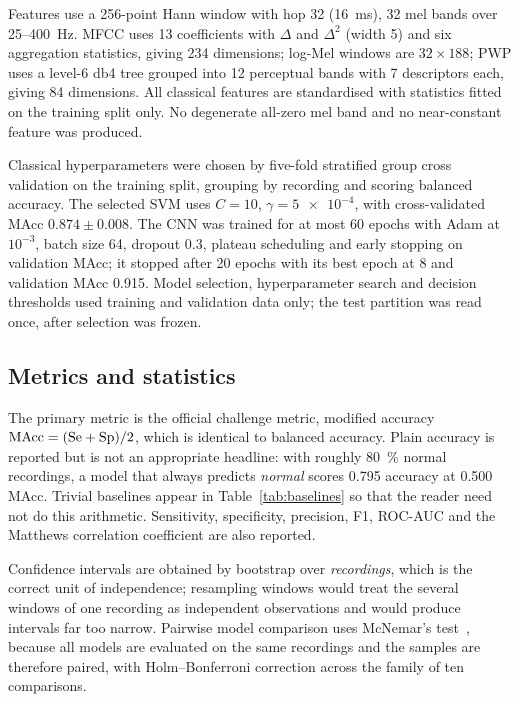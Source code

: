 Features use a 256-point Hann window with hop 32 (\SI{16}{\milli\second}), 32
mel bands over 25--\SI{400}{\hertz}. MFCC uses 13 coefficients with $\Delta$ and
$\Delta^2$ (width 5) and six aggregation statistics, giving 234 dimensions;
log-Mel windows are $32\times188$; PWP uses a level-6 db4 tree grouped into 12
perceptual bands with 7 descriptors each, giving 84 dimensions. All classical
features are standardised with statistics fitted on the training split only. No
degenerate all-zero mel band and no near-constant feature was produced.

Classical hyperparameters were chosen by five-fold stratified group cross
validation on the training split, grouping by recording and scoring balanced
accuracy. The selected SVM uses $C = 10$, $\gamma = \num{5e-4}$, with
cross-validated MAcc $0.874 \pm 0.008$. The CNN was trained for at most 60
epochs with Adam at $10^{-3}$, batch size 64, dropout \num{0.3}, plateau
scheduling and early stopping on validation MAcc; it stopped after 20 epochs
with its best epoch at 8 and validation MAcc \num{0.915}. Model selection,
hyperparameter search and decision thresholds used training and validation data
only; the test partition was read once, after selection was frozen.

\subsection{Metrics and statistics}

The primary metric is the official challenge metric, modified accuracy
$\mathrm{MAcc} = (\mathrm{Se} + \mathrm{Sp})/2$, which is identical to balanced
accuracy. Plain accuracy is reported but is not an appropriate headline: with
roughly \SI{80}{\percent} normal recordings, a model that always predicts
\emph{normal} scores \num{0.795} accuracy at \num{0.500} MAcc. Trivial baselines
appear in Table~\ref{tab:baselines} so that the reader need not do this
arithmetic. Sensitivity, specificity, precision, F1, ROC-AUC and the Matthews
correlation coefficient are also reported.

Confidence intervals are obtained by bootstrap over \emph{recordings}, which is
the correct unit of independence; resampling windows would treat the several
windows of one recording as independent observations and would produce intervals
far too narrow. Pairwise model comparison uses McNemar's
test~\cite{dietterich1998approximate}, because all models are evaluated on the
same recordings and the samples are therefore paired, with Holm--Bonferroni
correction across the family of ten comparisons.
